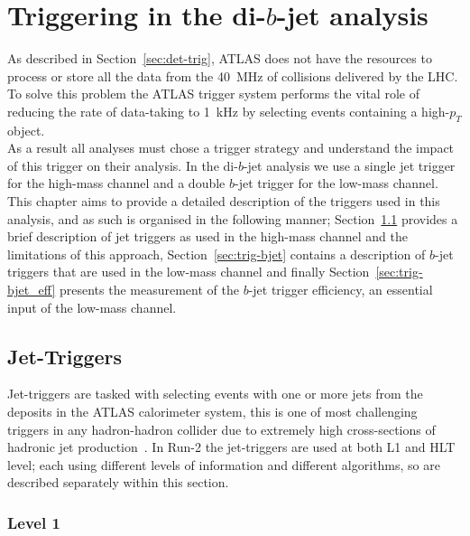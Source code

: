 \chapter{Triggering in the di-$b$-jet analysis}
\label{sec:trig}

As described in Section~\ref{sec:det-trig},
ATLAS does not have the resources to process or store all the data from the 40~MHz of collisions delivered by the LHC.
To solve this problem the ATLAS trigger system performs the vital role of
reducing the rate of data-taking to 1~kHz by selecting events containing a high-$p_T$ object.\\

As a result all analyses must chose a trigger strategy and understand the impact of this trigger on their analysis.
In the di-$b$-jet analysis we use a single jet trigger for the high-mass channel
and a double $b$-jet trigger for the low-mass channel.
This chapter aims to provide a detailed description of the triggers used in this analysis,
and as such is organised in the following manner;
Section~\ref{sec:trig-jet} provides a brief description of jet triggers as used in the high-mass channel and the limitations of this approach,
Section~\ref{sec:trig-bjet} contains a description of $b$-jet triggers that are used in the low-mass channel
and finally Section~\ref{sec:trig-bjet_eff} presents the measurement of the $b$-jet trigger efficiency, an essential input of the low-mass channel.

\section{Jet-Triggers}
\label{sec:trig-jet}

Jet-triggers are tasked with selecting events with one or more jets from the deposits in the ATLAS calorimeter system,
this is one of most challenging triggers in any hadron-hadron collider due to extremely high cross-sections of hadronic jet production~\cite{trig-run2_proc}.
In Run-2 the jet-triggers are used at both L1 and HLT level; each using different levels of information and different algorithms,
so are described separately within this section.


\subsection{Level 1}

